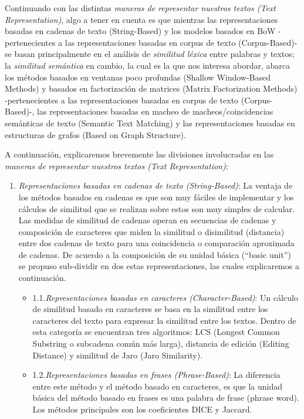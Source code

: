 \documentclass[12pt,a4paper]{article}
\begin{document}
\begin{sloppypar}
\begin{enumerate}
\end{enumerate}

Continuando con las distintas \textit{maneras de representar nuestros textos (Text Representation)}, algo a tener en cuenta es que mientras las representaciones basadas en cadenas de texto (String-Based) y los modelos basados en BoW -pertenecientes a las representaciones basadas en corpus de texto (Corpus-Based)- se basan principalmente en el análisis de \textit{similitud léxica} entre palabras y textos; la \textit{similitud semántica} en cambio, la cual es la que nos interesa abordar, abarca los métodos basados en ventanas poco profundas (Shallow Window-Based Methods) y basados en factorización de matrices (Matrix Factorization Methods) -pertenecientes a las representaciones basadas en corpus de texto (Corpus-Based)-, las representaciones basadas en macheo de macheos/coincidencias semánticas de texto (Semantic Text Matching) y las representaciones basadas en estructuras de grafos (Based on Graph Structure). 

A continuación, explicaremos brevemente las divisiones involucradas en las \textit{maneras de representar nuestros textos (Text Representation)}\cite{similarity_survey}:

\begin{enumerate}

\item \textit{Representaciones basadas en cadenas de texto (String-Based)}:
La ventaja de los métodos basados en cadenas es que son muy fáciles de implementar y los cálculos de similitud que se realizan sobre estos son muy simples de calcular. Las medidas de similitud de cadenas operan en secuencias de cadenas y composición de caracteres que miden la similitud o disimilitud (distancia) entre dos cadenas de texto para una coincidencia o comparación aproximada de cadenas. De acuerdo a la composición de su unidad básica (``basic unit'') se propuso sub-dividir en dos estas representaciones, las cuales explicaremos a continuación.

\begin{itemize}
\item 1.1.\textit{Representaciones basadas en caracteres (Character-Based)}: Un cálculo de similitud basado en caracteres se basa en la similitud entre los caracteres del texto para expresar la similitud entre los textos. Dentro de esta categoría se encuentran tres algoritmos: LCS (Longest Common Substring o subcadena común más larga), distancia de edición (Editing Distance) y similitud de Jaro (Jaro Similarity).
\item 1.2.\textit{Representaciones basadas en frases (Phrase-Based)}: La diferencia entre este método y el método basado en caracteres, es que la unidad básica del método basado en frases es una palabra de frase (phrase word). Los métodos principales son los coeficientes DICE y Jaccard. 
\end{itemize}


\end{enumerate}
\end{sloppypar}
\end{document}
